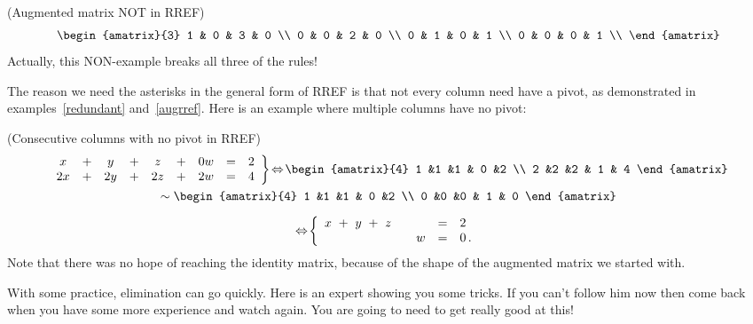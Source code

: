 \begin{example} (Augmented matrix NOT in RREF)
\[
\begin{amatrix}{3} 
1 & 0 & 3 & 0 \\ 
0 & 0 & 2 & 0 \\
0 & 1 & 0 & 1 \\
0 & 0 & 0 & 1 \\
\end{amatrix}
\]
Actually, this NON-example breaks all three of the rules!
\end{example}














The reason we need the asterisks in the general form of RREF is that
not every column need have a pivot, as demonstrated in examples~\ref{redundant} and~\ref{augrref}. 
Here is an example where multiple columns have no pivot:

\begin{example} (Consecutive  columns with no pivot in RREF)
\begin{multline*}
   \left.
\begin{array}{cccccccccr}
	 x & + & y &+ & z& + & 0w & = & 2 \\
	2x& +& 2y& +&2z&+&2w & = &  4
     \end{array}
   \right\} 
   \!\Leftrightarrow\!
\begin{amatrix}{4}
1 &1 &1 & 0 &2 \\ 
2 &2 &2 & 1 & 4
\end{amatrix}\\
\sim
\begin{amatrix}{4}
1 &1 &1 & 0 &2 \\ 
0 &0 &0 & 1 & 0
\end{amatrix}\\[2mm]
\!\Leftrightarrow\!
\left\{
\begin{array}{rrrrrr}
	x \ +\  y\  + \  z&&& = & 2 \phantom{\, .}\\
	&& w & = &  0\, .
     \end{array}
   \right.
\end{multline*}
Note that there was no hope of reaching the identity matrix, because of the shape of the augmented matrix we started with. 
\end{example}

With some practice, elimination can go  quickly. Here is an expert showing you some tricks. If you can't follow him now then come back when you have some more experience and watch again. You are going to need to get really good at this!

